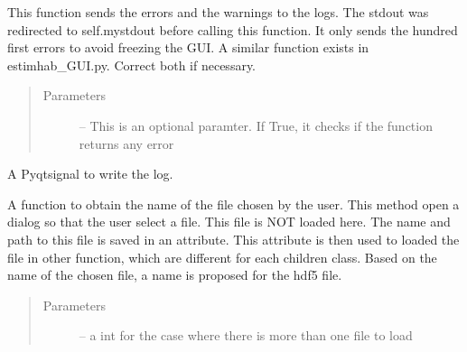 \documentclass[letterpaper,10pt,english]{sphinxmanual}
\begin{document}
\begin{fulllineitems}
\begin{fulllineitems}
\label{\detokenize{index:src_GUI.hydro_GUI_2.SubHydroW.send_err_log}}
This function sends the errors and the warnings to the logs.
The stdout was redirected to self.mystdout before calling this function. It only sends the hundred first errors
to avoid freezing the GUI. A similar function exists in estimhab\_GUI.py. Correct both if necessary.
\begin{quote}\begin{description}
\item[{Parameters}] \leavevmode
{} -- This is an optional paramter. If True, it checks if the function returns any error

\end{description}\end{quote}

\end{fulllineitems}


\begin{fulllineitems}
\label{\detokenize{index:src_GUI.hydro_GUI_2.SubHydroW.send_log}}
A Pyqtsignal to write the log.

\end{fulllineitems}


\begin{fulllineitems}
\label{\detokenize{index:src_GUI.hydro_GUI_2.SubHydroW.show_dialog}}
A function to obtain the name of the file chosen by the user. This method open a dialog so that the user select
a file. This file is NOT loaded here. The name and path to this file is saved in an attribute. This attribute
is then used to loaded the file in other function, which are different for each children class. Based on the
name of the chosen file, a name is proposed for the hdf5 file.
\begin{quote}\begin{description}
\item[{Parameters}] \leavevmode
{} -- a int for the case where there is more than one file to load

\end{description}\end{quote}


\end{fulllineitems}
\end{fulllineitems}
\end{document}

